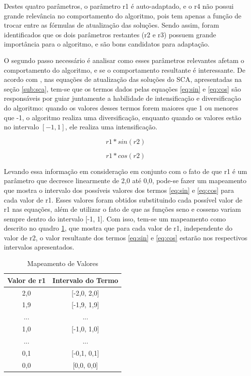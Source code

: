 Destes quatro parâmetros, o parâmetro r1 é auto-adaptado, e o r4 não possui grande relevância no comportamento do algoritmo, pois tem apenas a função de trocar entre as fórmulas de atualização das soluções. Sendo assim, foram identificados que os dois parâmetros restantes (r2 e r3) possuem grande importância para o algoritmo, e são bons candidatos para adaptação.

O segundo passo necessário é analisar como esses parâmetros relevantes afetam o comportamento do algoritmo, e se o comportamento resultante é interessante. De acordo com \cite{qu}, nas equações de atualização das soluções do SCA, apresentadas na seção \ref{sub:sca}, tem-se que os termos dados pelas equações \ref{eq:sin} e \ref{eq:cos} são responsáveis por guiar juntamente a habilidade de intensificação e diversificação do algoritmo: quando os valores desses termos forem maiores que 1 ou menores que -1, o algoritmo realiza uma diversificação, enquanto quando os valores estão no intervalo $[-1, 1]$, ele realiza uma intensificação.

\begin{equation}
\label{eq:sin}
r1 * sin(r2)
\end{equation}

\begin{equation}
\label{eq:cos}
r1 * cos(r2)
\end{equation}

Levando essa informação em consideração em conjunto com o fato de que r1 é um parâmetro que decresce linearmente de 2,0 até 0,0, pode-se fazer um mapeamento que mostra o intervalo dos possíveis valores dos termos \ref{eq:sin} e \ref{eq:cos} para cada valor de r1. Esses valores foram obtidos substituindo cada possível valor de r1 nas equações, além de utilizar o fato de que as funções seno e cosseno variam sempre dentro do intervalo [-1, 1]. Com isso, tem-se um mapeamento como descrito no quadro \ref{tab:mapeamento}, que mostra que para cada valor de r1, independente do valor de r2, o valor resultante dos termos \ref{eq:sin} e \ref{eq:cos} estarão nos respectivos intervalos apresentados.

\begin{table}[!htpb]
    \centering
    \begin{tabular}{c|c} %
    
      \textbf{Valor de r1} & \textbf{Intervalo do Termo}\\
      \hline
      2,0 & [-2,0, 2,0]\\
      \hline
      1,9 & [-1,9, 1,9]\\
      \hline
      ... & ...\\
      \hline
      1,0 & [-1,0, 1,0]\\
      \hline
      ... & ... \\
      \hline
      0,1 & [-0,1, 0,1]\\
      \hline
      0,0 & [0,0, 0,0]\\
    \end{tabular}
    \caption{Mapeamento de Valores}
    \label{tab:mapeamento}
\end{table}

